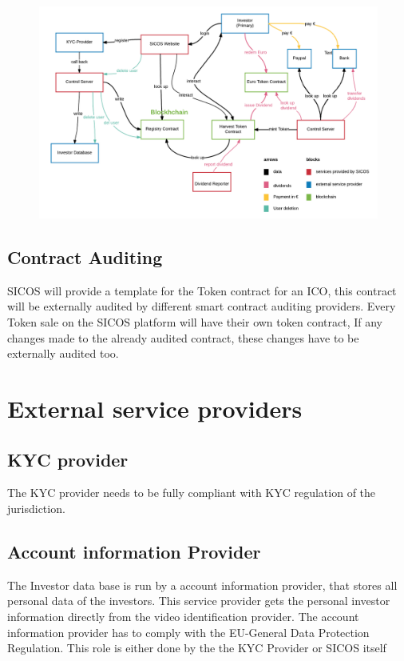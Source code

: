 \documentclass[11pt]{article}
\begin{document}
\begin{figure}
\begin{center}
\includegraphics[scale=0.38]{sicos-diagram2.png}    
\end{center}
\end{figure}

 
\subsection{Contract Auditing}
SICOS will provide a template for the Token contract for an ICO, this contract will be externally audited by different smart contract auditing providers. 
Every Token sale on the SICOS platform will have their own token contract, If any changes made to the already audited contract, these changes have to be externally audited too.
 
\section{External service providers}

\subsection{ KYC provider}
The KYC provider needs to be fully compliant with KYC regulation of the jurisdiction.

\subsection{Account information Provider}
The Investor data base is run by a account information provider, that stores all personal data of the investors. This service provider gets the personal investor information directly from the video identification provider. The account information provider has to comply with the EU-General Data Protection Regulation. This role is either done by the the KYC Provider or SICOS itself
\end{document}

